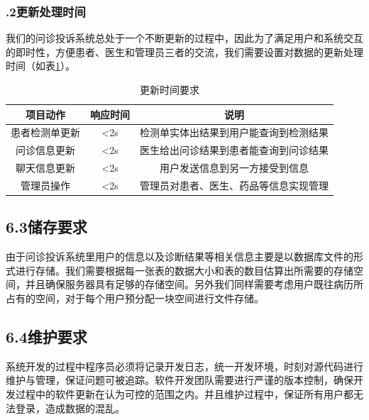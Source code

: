 \documentclass[24pt,a4paper]{article}%
\begin{document}
\subsubsection*{.2更新处理时间}

我们的问诊投诉系统总处于一个不断更新的过程中，因此为了满足用户和系统交互的即时性，方便患者、医生和管理员三者的交流，我们需要设置对数据的更新处理时间（如表\ref*{refresh-time}）。
\begin{table}[htpb]
	\centering
	\caption{更新时间要求}
	\label{refresh-time}
	\begin{tabular}{|c|c|c|}
		\hline
		项目动作 & 响应时间 & 说明\\ \hline
		患者检测单更新 & <2s & 检测单实体出结果到用户能查询到检测结果\\ \hline
		问诊信息更新 & <2s & 医生给出问诊结果到患者能查询到问诊结果\\ \hline
		聊天信息更新 & <2s & 用户发送信息到另一方接受到信息\\ \hline
		管理员操作 & <2s & 管理员对患者、医生、药品等信息实现管理\\ \hline
	\end{tabular}
\end{table}

\subsection*{\songti 6.3储存要求}

由于问诊投诉系统里用户的信息以及诊断结果等相关信息主要是以数据库文件的形式进行存储。我们需要根据每一张表的数据大小和表的数目估算出所需要的存储空间，并且确保服务器具有足够的存储空间。另外我们同样需要考虑用户既往病历所占有的空间，对于每个用户预分配一块空间进行文件存储。

\subsection*{\songti 6.4维护要求}

系统开发的过程中程序员必须将记录开发日志，统一开发环境，时刻对源代码进行维护与管理，保证问题可被追踪。软件开发团队需要进行严谨的版本控制，确保开发过程中的软件更新在认为可控的范围之内。并且维护过程中，保证所有用户都无法登录，造成数据的混乱。

\newpage
\end{document}
